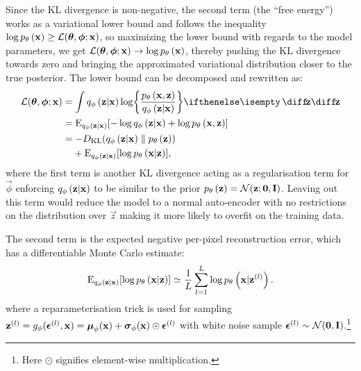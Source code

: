 Since the KL divergence is non-negative, the second term (the ``free energy'') works as a variational lower bound and follows the inequality $\log p_{\theta}\left(\bm{\mathrm{x}}\right) \ge \mathcal{L}(\bm{\mathrm{\theta}},\bm{\mathrm{\phi}};\bm{\mathrm{x}})$, so maximizing the lower bound with regards to the model parameters, we get $\mathcal{L}(\bm{\mathrm{\theta}},\bm{\mathrm{\phi}};\bm{\mathrm{x}})\rightarrow \log p_{\theta}\left(\bm{\mathrm{x}}\right)$, thereby pushing the KL divergence towards zero and bringing the approximated variational distribution closer to the true posterior.
The lower bound can be decomposed and rewritten as:
\begin{gather}
	\begin{split}
		\mathcal{L}\parens{\vec{\theta},\vec{\phi};\vec{x}} 
		& = \int \enc{\vec{z}|\vec{x}} \log \curlies*{ \frac{\dec{\vec{x},\vec{z}}}{\enc{\vec{z}|\vec{x}} } } \D{\vec{z}} \\
		& = \E_{\enc{\vec{z}|\vec{x}}} \brackets{- \log \enc{\vec{z}|\vec{x}} + \log \dec{\vec{x},\vec{z}} } 
		\\
		& = -D\idx{KL}\parens{ \enc{\vec{z}|\vec{x}} \parallel \dec{\vec{z}} }
        \\ & \hphantom{{}=}
        + \E_{\enc{\vec{z}|\vec{x}}} \brackets{\log \dec{\vec{x}|\vec{z}} } ,	
	\end{split}
\end{gather}
where the first term is another KL divergence acting as a regularisation term for $\vec{\phi}$ enforcing $q_{\phi}\left(\bm{\mathrm{z}}|\bm{\mathrm{x}}\right)$ to be similar to the prior $p_{\theta}\left(\bm{\mathrm{z}}\right) = \mathcal{N}(\bm{\mathrm{z}}; \bm{\mathrm{0}},\bm{\mathrm{I}})$. Leaving out this term would reduce the model to a normal auto-encoder with no restrictions on the distribution over $\vec{z}$ making it more likely to overfit on the training data.

The second term is the expected negative per-pixel reconstruction error, which has a differentiable Monte Carlo estimate:
\begin{equation}
	\operatorname{E}_{q_{\phi}\left(\bm{\mathrm{z}}|\bm{\mathrm{x}}\right)} [\log p_{\theta}\left(\bm{\mathrm{x}}|\bm{\mathrm{z}}\right) ] \simeq \frac{1}{L}\sum^L_{l=1} \log p_{\theta}\left(\bm{\mathrm{x}}|\bm{\mathrm{z}}^{(l)}\right).
\end{equation}
where a reparameterisation trick is used for sampling $\bm{\mathrm{z}}^{(l)}= g_\phi (\bm{\mathrm{\epsilon}}^{(l)}, \bm{\mathrm{x}})= \bm{\mathrm{\mu}}_\phi(\bm{\mathrm{x}}) + \bm{\mathrm{\sigma}}_\phi(\bm{\mathrm{x}}) \odot \bm{\mathrm{\epsilon}}^{(l)}$ with white noise sample $\bm{\mathrm{\epsilon}}^{(l)} \sim \mathcal{N}(\bm{\mathrm{0}},\bm{\mathrm{I}})$.\footnote{Here $\odot$ signifies element-wise
multiplication.}

